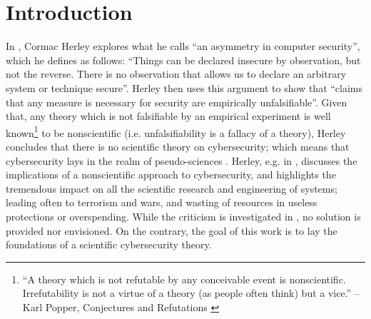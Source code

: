 \documentclass[conference]{IEEEtran}
\begin{document}
\section{Introduction}\label{sec:intro}
In \autocite{Herley2016unfalsifiability}, Cormac Herley explores what he calls
``an asymmetry in computer security'', which he defines as follows: ``Things
can be declared insecure by observation, but not the reverse. There is no
observation that allows us to declare an arbitrary system or technique
secure''. Herley then uses this argument to show that ``claims that any measure
is necessary for security are empirically unfalsifiable''. Given that, any
theory which is not falsifiable by an empirical experiment is well
known\footnote{``A theory which is not refutable by any conceivable event is
nonscientific. Irrefutability is not a virtue of a theory (as people often
think) but a vice.'' -- Karl Popper, Conjectures and
Refutations \autocite{popper1962conjectures}} to be nonscientific (i.e.
unfalsifiability is a fallacy of a theory), Herley concludes that there is no
scientific theory on cybersecurity; which means that cybersecurity lays in the
realm of pseudo-sciences \autocite{Herley2016usenixvideo}.  Herley, e.g.
in \autocite{Herley2017justifying}, discusses the implications of a
nonscientific approach to cybersecurity, and highlights the tremendous impact on
all the scientific research and engineering of systems; leading often to
terrorism and wars, and wasting of resources in useless protections or
overspending.  While the criticism is investigated
in \autocite{Herley2016unfalsifiability}, no solution is provided nor envisioned.  On the
contrary, the goal of this work is to lay the foundations of a
scientific cybersecurity theory. 
\end{document}
